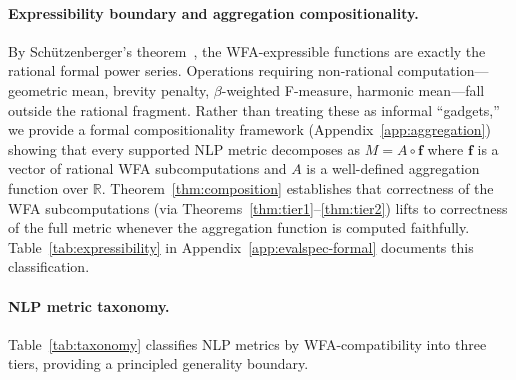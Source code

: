 \documentclass[11pt]{article}
\newcommand{\R}{\mathbb{R}}
\begin{document}
\paragraph{Expressibility boundary and aggregation compositionality.}
By Sch\"utzenberger's theorem~\cite{schutzenberger1961}, the
WFA-expressible functions are exactly the rational formal power series.
Operations requiring non-rational computation---geometric mean, brevity
penalty, $\beta$-weighted F-measure, harmonic mean---fall outside the
rational fragment.  Rather than treating these as informal ``gadgets,''
we provide a formal compositionality framework
(Appendix~\ref{app:aggregation}) showing that every supported NLP
metric decomposes as $M = A \circ \mathbf{f}$ where $\mathbf{f}$ is a
vector of rational WFA subcomputations and $A$ is a well-defined
aggregation function over $\R$.  Theorem~\ref{thm:composition}
establishes that correctness of the WFA subcomputations (via
Theorems~\ref{thm:tier1}--\ref{thm:tier2}) lifts to correctness of the
full metric whenever the aggregation function is computed faithfully.
Table~\ref{tab:expressibility} in Appendix~\ref{app:evalspec-formal}
documents this classification.

\paragraph{NLP metric taxonomy.}
Table~\ref{tab:taxonomy} classifies NLP metrics by WFA-compatibility
into three tiers, providing a principled generality boundary.
\end{document}
